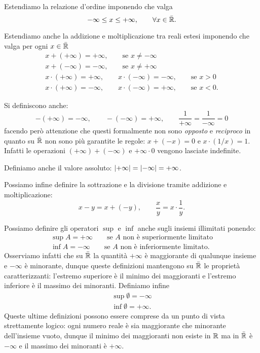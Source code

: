 Estendiamo la relazione d'ordine imponendo che valga
\[
  -\infty \le x \le +\infty, \qquad \forall x \in \bar{{\mathbb R}}.
\]

Estendiamo anche la addizione e moltiplicazione
tra reali estesi imponendo che valga per ogni $x\in \bar {{\mathbb R}}$
\begin{gather*}
  x + (+\infty) = +\infty, \qquad \text{se $x\neq -\infty$}\\
  x + (-\infty) = -\infty, \qquad \text{se $x\neq +\infty$}\\
  x \cdot (+\infty) = +\infty, \qquad
  x \cdot (-\infty) = -\infty, \qquad \text{se $x>0$} \\
  x \cdot (+\infty) = -\infty, \qquad
  x \cdot (-\infty) = +\infty, \qquad \text{se $x<0$}.
\end{gather*}

Si definiscono anche:
\[
 -(+\infty) = -\infty, \qquad
 -(-\infty) = +\infty, \qquad
 \frac{1}{+\infty} = \frac{1}{-\infty}=0
\]
facendo però attenzione che
questi formalmente non sono \emph{opposto}
e \emph{reciproco} in quanto
su $\bar {{\mathbb R}}$ non sono più garantite
le regole: $x + (-x) = 0$ e $x \cdot (1/x) = 1$.
Infatti
le operazioni $(+\infty) + (-\infty)$ e $+\infty \cdot 0$ vengono
lasciate indefinite.

Definiamo anche il valore assoluto: ${\left|+\infty\right|} = {\left|-\infty\right|} = +\infty$.

Possiamo infine definire la sottrazione e la divisione tramite
addizione e moltiplicazione:
\[
  x - y = x + (-y), \qquad \frac{x}{y} = x \cdot \frac{1}{y}.
\]

Possiamo definire gli operatori $\sup$ e $\inf$
anche sugli insiemi illimitati ponendo:
\begin{align*}
  \sup A = +\infty \qquad \text{se $A$ non è superiormente limitato}\\
  \inf A = -\infty \qquad \text{se $A$ non è inferiormente limitato}.
\end{align*}
Osserviamo infatti che su $\bar {{\mathbb R}}$ la quantità $+\infty$
è maggiorante di qualunque insieme e $-\infty$ è minorante, dunque
queste definizioni mantengono su $\bar {{\mathbb R}}$ le proprietà caratterizzanti:
l'estremo superiore è il minimo dei maggioranti e
l'estremo inferiore è il massimo dei minoranti.
Definiamo infine
\begin{align*}
  \sup \emptyset = -\infty\\
  \inf \emptyset = +\infty.
\end{align*}
Queste ultime definizioni possono essere comprese da un punto di vista
strettamente logico: ogni numero reale è sia maggiorante che minorante
dell'insieme vuoto, dunque il minimo dei maggioranti non esiste in ${\mathbb R}$
ma in $\bar {{\mathbb R}}$ è $-\infty$
e il massimo dei minoranti è $+\infty$.


